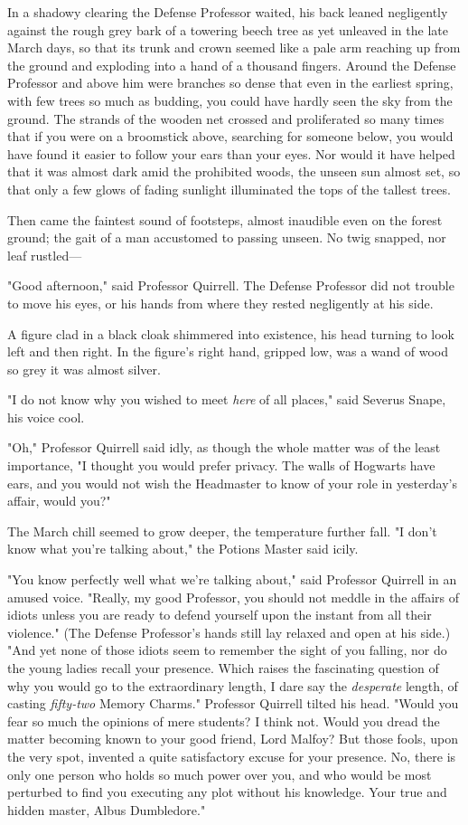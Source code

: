 In a shadowy clearing the Defense Professor waited, his back leaned negligently 
against the rough grey bark of a towering beech tree as yet unleaved in the 
late March days, so that its trunk and crown seemed like a pale arm reaching up 
from the ground and exploding into a hand of a thousand fingers. Around the 
Defense Professor and above him were branches so dense that even in the 
earliest spring, with few trees so much as budding, you could have hardly seen 
the sky from the ground. The strands of the wooden net crossed and proliferated 
so many times that if you were on a broomstick above, searching for someone 
below, you would have found it easier to follow your ears than your eyes. Nor 
would it have helped that it was almost dark amid the prohibited woods, the 
unseen sun almost set, so that only a few glows of fading sunlight illuminated 
the tops of the tallest trees.

Then came the faintest sound of footsteps, almost inaudible even on the forest 
ground; the gait of a man accustomed to passing unseen. No twig snapped, nor 
leaf rustled---

"Good afternoon," said Professor Quirrell. The Defense Professor did not 
trouble to move his eyes, or his hands from where they rested negligently at 
his side.

A figure clad in a black cloak shimmered into existence, his head turning to 
look left and then right. In the figure's right hand, gripped low, was a wand 
of wood so grey it was almost silver.

"I do not know why you wished to meet \emph{here} of all places," said Severus 
Snape, his voice cool.

"Oh," Professor Quirrell said idly, as though the whole matter was of the least 
importance, "I thought you would prefer privacy. The walls of Hogwarts have 
ears, and you would not wish the Headmaster to know of your role in yesterday's 
affair, would you?"

The March chill seemed to grow deeper, the temperature further fall. "I don't 
know what you're talking about," the Potions Master said icily.

"You know perfectly well what we're talking about," said Professor Quirrell in 
an amused voice. "Really, my good Professor, you should not meddle in the 
affairs of idiots unless you are ready to defend yourself upon the instant from 
all their violence." (The Defense Professor's hands still lay relaxed and open 
at his side.) "And yet none of those idiots seem to remember the sight of you 
falling, nor do the young ladies recall your presence. Which raises the 
fascinating question of why you would go to the extraordinary length, I dare 
say the \emph{desperate} length, of casting \emph{fifty-two} Memory Charms." 
Professor Quirrell tilted his head. "Would you fear so much the opinions of 
mere students? I think not. Would you dread the matter becoming known to your 
good friend, Lord Malfoy? But those fools, upon the very spot, invented a quite 
satisfactory excuse for your presence. No, there is only one person who holds 
so much power over you, and who would be most perturbed to find you executing 
any plot without his knowledge. Your true and hidden master, Albus Dumbledore."

